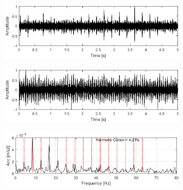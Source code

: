 \begin{figure}[!ht]
    \centering
    \begin{subfigure}[b]{0.49\textwidth}
        \centering
        \captionsetup{skip=0.01pt}
        \caption{}
        \includegraphics[width=\textwidth]{wykresy/chapter_application/semi_blind/sygnalL212_4.png}
        \label{fig:chapter7/semi_blind/ext_comp_L212_4}
    \end{subfigure}
     \vspace{-1\baselineskip}
    \begin{subfigure}[b]{0.49\textwidth}
        \centering
        \captionsetup{skip=0.01pt}
        \caption{}
        \includegraphics[width=\textwidth]{wykresy/chapter_application/semi_blind/sygnalL212_16.png}
        \label{fig:chapter7/semi_blind/ext_comp_L212_16}
    \end{subfigure}
     \vspace{-1\baselineskip}
    \begin{subfigure}[b]{0.49\textwidth}
        \centering
        \captionsetup{skip=0.01pt}
        \caption{}
        \includegraphics[width=\textwidth]{wykresy/chapter_application/semi_blind/widmo_obwiedniL212_4.png}
        \label{fig:chapter7/semi_blind/ext_widmo_obwiedni_L212_4}
    \end{subfigure}

\end{figure}

